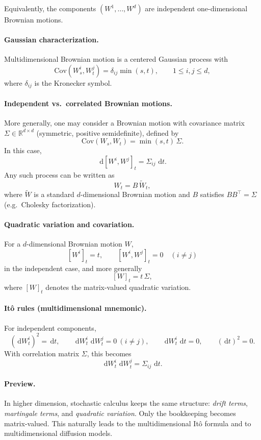 \documentclass[11pt]{article}
\newcommand{\R}{\mathbb{R}}
\newcommand{\Cov}{\mathrm{Cov}}
\newcommand{\dd}{\,\mathrm{d}}
\newcommand{\1}{\mathbf{1}}
\theoremstyle{plain}
\theoremstyle{definition}
\theoremstyle{remark}
\begin{document}
Equivalently, the components $(W^1,\dots,W^d)$ are independent
one-dimensional Brownian motions.

\paragraph{Gaussian characterization.}
Multidimensional Brownian motion is a centered Gaussian process with
\[
\Cov(W_s^i,W_t^j)=\delta_{ij}\min(s,t),
\qquad 1\le i,j\le d,
\]
where $\delta_{ij}$ is the Kronecker symbol.

\paragraph{Independent vs.\ correlated Brownian motions.}
More generally, one may consider a Brownian motion with covariance matrix
$\Sigma\in\R^{d\times d}$ (symmetric, positive semidefinite), defined by
\[
\Cov(W_s,W_t)=\min(s,t)\,\Sigma.
\]
In this case,
\[
\dd[W^i,W^j]_t=\Sigma_{ij}\,\dd t.
\]
Any such process can be written as
\[
W_t = B\,\widetilde W_t,
\]
where $\widetilde W$ is a standard $d$-dimensional Brownian motion
and $B$ satisfies $BB^\top=\Sigma$ (e.g.\ Cholesky factorization).

\paragraph{Quadratic variation and covariation.}
For a $d$-dimensional Brownian motion $W$,
\[
[W^i]_t = t,
\qquad
[W^i,W^j]_t = 0 \quad (i\neq j)
\]
in the independent case, and more generally
\[
[W]_t = t\,\Sigma,
\]
where $[W]_t$ denotes the matrix-valued quadratic variation.

\paragraph{It\^o rules (multidimensional mnemonic).}
For independent components,
\[
(\dd W_t^i)^2=\dd t,
\qquad
\dd W_t^i\,\dd W_t^j=0 \ (i\neq j),
\qquad
\dd W_t^i\,\dd t=0,
\qquad
(\dd t)^2=0.
\]
With correlation matrix $\Sigma$, this becomes
\[
\dd W_t^i\,\dd W_t^j=\Sigma_{ij}\,\dd t.
\]

\paragraph{Preview.}
In higher dimension, stochastic calculus keeps the same structure:
\emph{drift terms}, \emph{martingale terms}, and \emph{quadratic variation}.
Only the bookkeeping becomes matrix-valued.
This naturally leads to the multidimensional It\^o formula
and to multidimensional diffusion models.
\end{document}
